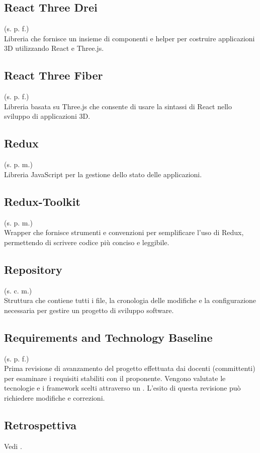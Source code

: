 \subsection{React Three Drei}
\label{React Three Drei}
(s. p. f.)\\
Libreria che fornisce un insieme di componenti e helper per
costruire applicazioni 3D utilizzando React e Three.js.
\subsection{React Three Fiber}
\label{React Three Fiber}
(s. p. f.)\\
Libreria basata su Three.js che consente di usare la sintassi
di React nello sviluppo di applicazioni 3D.
\subsection{Redux}
(s. p. m.)\\
Libreria JavaScript per la gestione dello stato delle applicazioni.
\subsection{Redux-Toolkit}
(s. p. m.)\\
Wrapper che fornisce strumenti e convenzioni per semplificare l'uso di Redux,
permettendo di scrivere codice più conciso e leggibile.
\subsection{Repository}
\label{Repository}
(s. c. m.)\\
Struttura che contiene tutti i file, la cronologia delle modifiche e la
configurazione necessaria per gestire un progetto di sviluppo software.
\subsection{Requirements and Technology Baseline}
\label{Requirements and Technology Baseline}
(s. p. f.)\\
Prima revisione di avanzamento del progetto effettuata dai docenti (committenti)
per esaminare i requisiti stabiliti con il proponente. Vengono valutate le
tecnologie e i framework scelti attraverso un .
L'esito di questa revisione può richiedere modifiche e correzioni.
\subsection{Retrospettiva}
Vedi .
